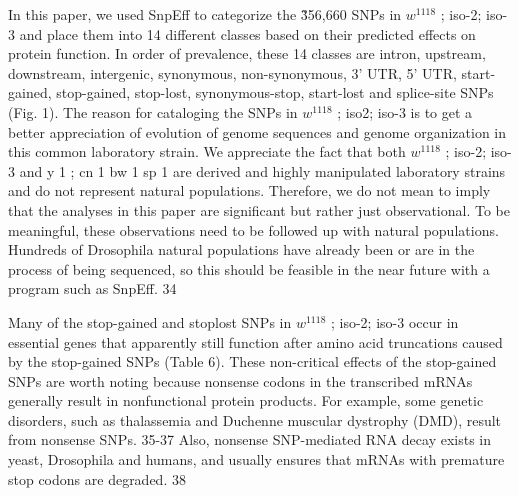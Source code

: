 In this paper, we used SnpEff to categorize the \~356,660 SNPs in $w^{1118}$ ; iso-2; iso-3 and place them into 14 different classes based on their predicted effects on protein function. In order of prevalence, these 14 classes are intron, upstream, downstream, intergenic, synonymous, non-synonymous, 3' UTR, 5' UTR, start-gained, stop-gained, stop-lost, synonymous-stop, start-lost and splice-site SNPs (Fig. 1). The reason for cataloging the SNPs in $w^{1118}$ ; iso2; iso-3 is to get a better appreciation of evolution of genome sequences and genome organization in this common laboratory strain. We appreciate the fact that both $w^{1118}$ ; iso-2; iso-3 and y 1 ; cn 1 bw 1 sp 1 are derived and highly manipulated laboratory strains and do not represent natural populations. Therefore, we do not mean to imply that the analyses in this paper are significant but rather just observational. To be meaningful, these observations need to be followed up with natural populations. Hundreds of Drosophila natural populations have already been or are in the process of being sequenced, so this should be feasible in the near future with a program such as SnpEff. 34

Many of the stop-gained and stoplost SNPs in $w^{1118}$ ; iso-2; iso-3 occur in essential genes that apparently still function after amino acid truncations caused by the stop-gained SNPs (Table 6). These non-critical effects of the stop-gained SNPs are worth noting because nonsense codons in the transcribed mRNAs generally result in nonfunctional protein products. For example, some genetic disorders, such as thalassemia and Duchenne muscular dystrophy (DMD), result from nonsense SNPs. 35-37 Also, nonsense SNP-mediated RNA decay exists in yeast, Drosophila and humans, and usually ensures that mRNAs with premature stop codons are degraded. 38

